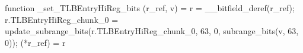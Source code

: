 function _set_TLBEntryHiReg_bits (r_ref, v) = {
    r = __bitfield_deref(r_ref);
    r.TLBEntryHiReg_chunk_0 = update_subrange_bits(r.TLBEntryHiReg_chunk_0, 63, 0, subrange_bits(v, 63, 0));
    (*r_ref) = r
}
